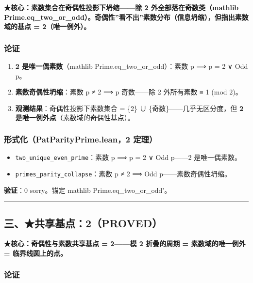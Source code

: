 \documentclass[
]{article}
\providecommand{\tightlist}{%
 \setlength{\itemsep}{0pt}\setlength{\parskip}{0pt}}
\begin{document}
\textbf{★核心：素数集合在奇偶性投影下坍缩------除 2
外全部落在奇数类（mathlib
Prime.eq\_two\_or\_odd）。奇偶性''看不出''素数分布（信息坍缩），但指出素数域的基点
= 2（唯一例外）。}

\subsubsection{论证}\label{ux8bbaux8bc1-1}

\begin{enumerate}
\def\labelenumi{\arabic{enumi}.}
\tightlist
\item
 \textbf{2 是唯一偶素数}（mathlib Prime.eq\_two\_or\_odd）：素数 p ⟹ p
 = 2 ∨ Odd p。
\item
 \textbf{素数奇偶性坍缩}：素数 p ≠ 2 ⟹ p 奇数------除 2 外所有素数 ≡ 1
 (mod 2)。
\item
 \textbf{观测结果}：奇偶性投影下素数集合 = \{2\} ∪
 \{奇数\}------几乎无区分度，但 \textbf{2
 是唯一例外点}（素数域的奇偶性基点）。
\end{enumerate}

\subsubsection{形式化（PatParityPrime.lean，2
定理）}\label{ux5f62ux5f0fux5316patparityprime.lean2-ux5b9aux7406}

\begin{itemize}
\tightlist
\item
 \texttt{two\_unique\_even\_prime}：素数 p ⟹ p = 2 ∨ Odd p------2
 是唯一偶素数。
\item
 \texttt{primes\_parity\_collapse}：素数 p ≠ 2 ⟹ Odd
 p------素数奇偶性坍缩。
\end{itemize}

\textbf{验证}：0 sorry。锚定 mathlib Prime.eq\_two\_or\_odd'。

\begin{center}\rule{0.5\linewidth}{0.5pt}\end{center}

\subsection{三、★共享基点：2（PROVED）}\label{ux4e09ux5171ux4eabux57faux70b92proved}

\textbf{★核心：奇偶性与素数共享基点 = 2------模 2 折叠的周期 =
素数域的唯一例外 = 临界线圆上的点。}

\subsubsection{论证}\label{ux8bbaux8bc1-2}
\end{document}
